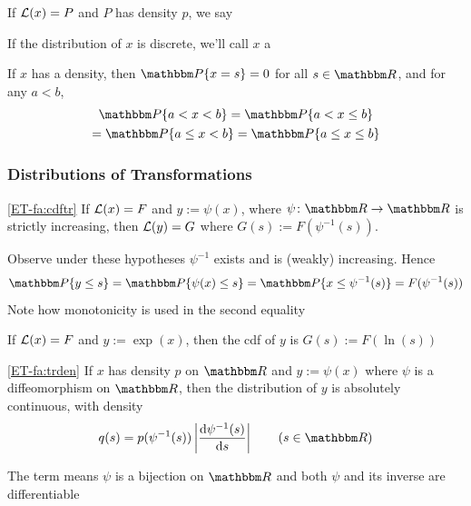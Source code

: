 \begin{frame}
    
    \vspace{2em}
    If $\mathcal L(x) = P$ and $P$ has density $p$, we say
    
    If the distribution of $x$ is discrete, we'll call
    $x$ a 
    
    \vspace{1em}
    \Fact
    If $x$ has a density, then $\PP\{x=s\}=0$ for all $s \in \RR$, and for
    any $a < b$,
    \begin{multline*}
        \PP\{a < x < b\}
        = \PP\{a < x \leq b\}
        \\ = \PP\{a \leq x < b\}
        = \PP\{a \leq x \leq b\}
    \end{multline*}
\end{frame}

\begin{frame}\frametitle{Distributions of Transformations}

    \vspace{2em}
    \Fact\eqref{ET-fa:cdftr}
    If $\mathcal L(x) = F$ and $y := \psi(x)$, where $\psi \colon \RR \to \RR$ is
    strictly increasing, then $\mathcal L(y)= G$ where $G(s) := F(\psi^{-1}(s))$.
    
    \Prf
    Observe under these hypotheses $\psi^{-1}$ exists and is
    (weakly) increasing.  Hence 
    \begin{equation*}
        \PP\{y \leq s\} 
        = \PP\{\psi(x) \leq s\} 
        = \PP\{x \leq \psi^{-1}(s) \} 
        = F( \psi^{-1}(s) )
    \end{equation*}
    Note how monotonicity is used in the second equality

\end{frame}

\begin{frame}

    \vspace{2em}
    \Eg
    If $\mathcal L(x) = F$ and $y := \exp(x)$, then the {\sc cdf} of $y$ is $G(s) := F(\ln(s))$
    
\end{frame}

\begin{frame}

    \vspace{2em}
    \Fact\eqref{ET-fa:trden}
    If $x$ has density $p$ on $\RR$ and $y := \psi(x)$ where $\psi$ is a
    diffeomorphism on $\RR$, then the distribution of $y$ is absolutely
    continuous, with density
    \begin{equation*}
        \label{eq:trden}
        q(s) = p(\psi^{-1}(s)) \left| \frac{\diff \psi^{-1}(s)}{\diff s} \right|
                 \qquad (s \in \RR)
    \end{equation*}
    
    
    \vspace{1em}
    The term  means  $\psi$ is a bijection on
    $\RR$ and both $\psi$ and its inverse are differentiable
    
\end{frame}

